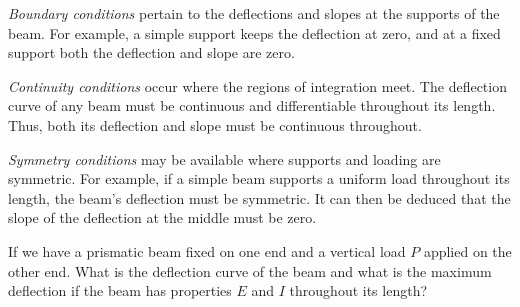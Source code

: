 \documentclass[
10pt,
a4paper,
openany,
svgnames,
]{book} %
\begin{document}
\emph{Boundary conditions} pertain to the deflections and slopes at the supports of the beam. For example, a simple support keeps the deflection at zero, and at a fixed support both the deflection and slope are zero.

\emph{Continuity conditions} occur where the regions of integration meet. The deflection curve of any beam must be continuous and differentiable throughout its length. Thus, both its deflection and slope must be continuous throughout.

\emph{Symmetry conditions} may be available where supports and loading are symmetric. For example, if a simple beam supports a uniform load throughout its length, the beam's deflection must be symmetric. It can then be deduced that the slope of the deflection at the middle must be zero.

\begin{example} \label{example: cantilever beam deflection}
  If we have a prismatic beam fixed on one end and a vertical load $P$ applied on the other end. What is the deflection curve of the beam and what is the maximum deflection if the beam has properties $E$ and $I$ throughout its length?

  \begin{figure}[H]
    \centering
  \end{figure}
  
\end{example}
\end{document}
